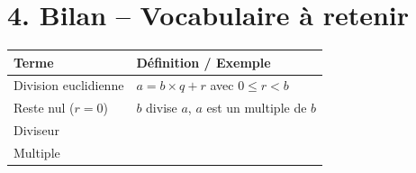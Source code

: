 \documentclass[a4paper]{book}
\begin{document}
\section*{4. Bilan -- Vocabulaire à retenir}

    \begin{center}
    \renewcommand{\arraystretch}{2}
    \begin{tabular}{|p{4.5cm}|p{9.5cm}|}
    \hline
    \textbf{Terme} & \textbf{Définition / Exemple} \\ \hline
    Division euclidienne & $a = b \times q + r$ avec $0 \leq r < b$ \\ \hline
    Reste nul ($r = 0$)  & $b$ divise $a$, $a$ est un multiple de $b$ \\ \hline
    Diviseur             & \hspace{6cm} \\ \hline
    Multiple             & \hspace{6cm} \\ \hline
    \end{tabular}
    \end{center}
\end{document}
